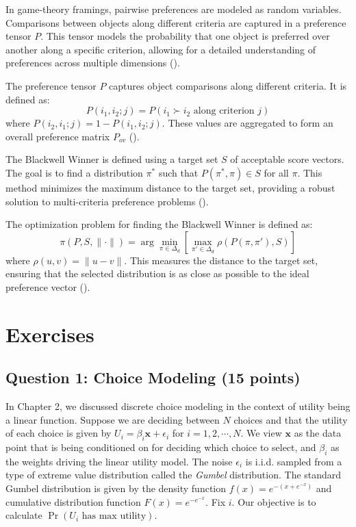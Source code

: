 \documentclass[
  letterpaper,
  numbers=noenddot,
  DIV=11]{scrreprt}
\theoremstyle{definition}
\theoremstyle{plain}
\theoremstyle{plain}
\theoremstyle{remark}
\begin{document}
In game-theory framings, pairwise preferences are modeled as random
variables. Comparisons between objects along different criteria are
captured in a preference tensor \(P\). This tensor models the
probability that one object is preferred over another along a specific
criterion, allowing for a detailed understanding of preferences across
multiple dimensions ().

The preference tensor \(P\) captures object comparisons along different
criteria. It is defined as:
\[P(i_1, i_2; j) = P(i_1 \succ i_2 \text{ along criterion } j)\] where
\(P(i_2, i_1; j) = 1 - P(i_1, i_2; j)\). These values are aggregated to
form an overall preference matrix \(P_{ov}\)
().

The Blackwell Winner is defined using a target set \(S\) of acceptable
score vectors. The goal is to find a distribution \(\pi^*\) such that
\(P(\pi^*, \pi) \in S\) for all \(\pi\). This method minimizes the
maximum distance to the target set, providing a robust solution to
multi-criteria preference problems
().

The optimization problem for finding the Blackwell Winner is defined as:
\[\pi(P, S, \|\cdot\|) = \arg \min_{\pi \in \Delta_d} \left[ \max_{\pi' \in \Delta_d} \rho(P(\pi, \pi'), S) \right]\]
where \(\rho(u, v) = \|u - v\|\). This measures the distance to the
target set, ensuring that the selected distribution is as close as
possible to the ideal preference vector
().

\section{Exercises}\label{exercises}

\subsection*{Question 1: Choice Modeling (15
points)}\label{question-1-choice-modeling-15-points}

In Chapter 2, we discussed discrete choice modeling in the context of
utility being a linear function. Suppose we are deciding between \(N\)
choices and that the utility of each choice is given by
\(U_i=\beta_i\mathbf{x}+\epsilon_i\) for \(i=1, 2, \cdots, N\). We view
\(\mathbf{x}\) as the data point that is being conditioned on for
deciding which choice to select, and \(\beta_i\) as the weights driving
the linear utility model. The noise \(\epsilon_i\) is i.i.d. sampled
from a type of extreme value distribution called the \emph{Gumbel}
distribution. The standard Gumbel distribution is given by the density
function \(f(x)=e^{-(x+e^{-x})}\) and cumulative distribution function
\(F(x)=e^{-e^{-x}}.\) Fix \(i\). Our objective is to calculate
\(\Pr(U_i\,\, \text{has max utility})\).
\end{document}
